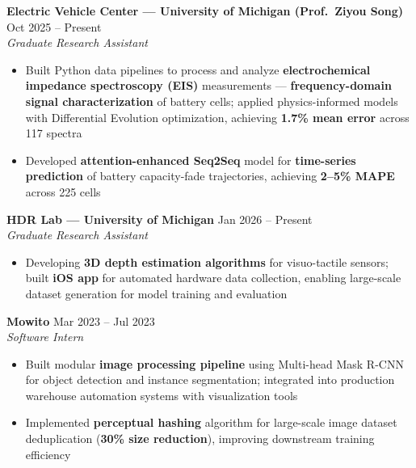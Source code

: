 \documentclass[9pt]{article}
\begin{document}
\vspace{-1mm}
\textbf{Electric Vehicle Center --- University of Michigan (Prof.\ Ziyou Song)} \hfill Oct 2025 -- Present\\
\emph{Graduate Research Assistant}
\vspace{-2mm}
\begin{itemize}[leftmargin=*,noitemsep,topsep=1pt]
  \item Built Python data pipelines to process and analyze \textbf{electrochemical impedance spectroscopy (EIS)} measurements --- \textbf{frequency-domain signal characterization} of battery cells; applied physics-informed models with Differential Evolution optimization, achieving \textbf{1.7\% mean error} across 117 spectra
  \item Developed \textbf{attention-enhanced Seq2Seq} model for \textbf{time-series prediction} of battery capacity-fade trajectories, achieving \textbf{2--5\% MAPE} across 225 cells
\end{itemize}

\vspace{-1mm}
\textbf{HDR Lab --- University of Michigan} \hfill Jan 2026 -- Present\\
\emph{Graduate Research Assistant}
\vspace{-2mm}
\begin{itemize}[leftmargin=*,noitemsep,topsep=1pt]
  \item Developing \textbf{3D depth estimation algorithms} for visuo-tactile sensors; built \textbf{iOS app} for automated hardware data collection, enabling large-scale dataset generation for model training and evaluation
\end{itemize}

\vspace{-1mm}
\textbf{Mowito} \hfill Mar 2023 -- Jul 2023\\
\emph{Software Intern}
\vspace{-2mm}
\begin{itemize}[leftmargin=*,noitemsep,topsep=1pt]
  \item Built modular \textbf{image processing pipeline} using Multi-head Mask R-CNN for object detection and instance segmentation; integrated into production warehouse automation systems with visualization tools
  \item Implemented \textbf{perceptual hashing} algorithm for large-scale image dataset deduplication (\textbf{30\% size reduction}), improving downstream training efficiency
\end{itemize}
\end{document}
